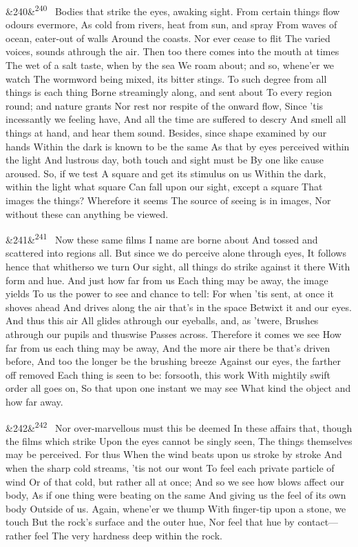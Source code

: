 \documentclass[12pt]{article}
\newcommand{\para}[1][]{\par\noindent\ifx&#1&\else\textsuperscript{\footnotesize #1}~\fi}
\begin{document}
\para[240] Bodies that strike the eyes, awaking sight. From certain things flow odours evermore, As cold from rivers, heat from sun, and spray From waves of ocean, eater-out of walls Around the coasts. Nor ever cease to flit The varied voices, sounds athrough the air. Then too there comes into the mouth at times The wet of a salt taste, when by the sea We roam about; and so, whene'er we watch The wormword being mixed, its bitter stings. To such degree from all things is each thing Borne streamingly along, and sent about To every region round; and nature grants Nor rest nor respite of the onward flow, Since 'tis incessantly we feeling have, And all the time are suffered to descry And smell all things at hand, and hear them sound. Besides, since shape examined by our hands Within the dark is known to be the same As that by eyes perceived within the light And lustrous day, both touch and sight must be By one like cause aroused. So, if we test A square and get its stimulus on us Within the dark, within the light what square Can fall upon our sight, except a square That images the things? Wherefore it seems The source of seeing is in images, Nor without these can anything be viewed.

\para[241] Now these same films I name are borne about And tossed and scattered into regions all. But since we do perceive alone through eyes, It follows hence that whitherso we turn Our sight, all things do strike against it there With form and hue. And just how far from us Each thing may be away, the image yields To us the power to see and chance to tell: For when 'tis sent, at once it shoves ahead And drives along the air that's in the space Betwixt it and our eyes. And thus this air All glides athrough our eyeballs, and, as 'twere, Brushes athrough our pupils and thuswise Passes across. Therefore it comes we see How far from us each thing may be away, And the more air there be that's driven before, And too the longer be the brushing breeze Against our eyes, the farther off removed Each thing is seen to be: forsooth, this work With mightily swift order all goes on, So that upon one instant we may see What kind the object and how far away.

\para[242] Nor over-marvellous must this be deemed In these affairs that, though the films which strike Upon the eyes cannot be singly seen, The things themselves may be perceived. For thus When the wind beats upon us stroke by stroke And when the sharp cold streams, 'tis not our wont To feel each private particle of wind Or of that cold, but rather all at once; And so we see how blows affect our body, As if one thing were beating on the same And giving us the feel of its own body Outside of us. Again, whene'er we thump With finger-tip upon a stone, we touch But the rock's surface and the outer hue, Nor feel that hue by contact---rather feel The very hardness deep within the rock.
\end{document}
